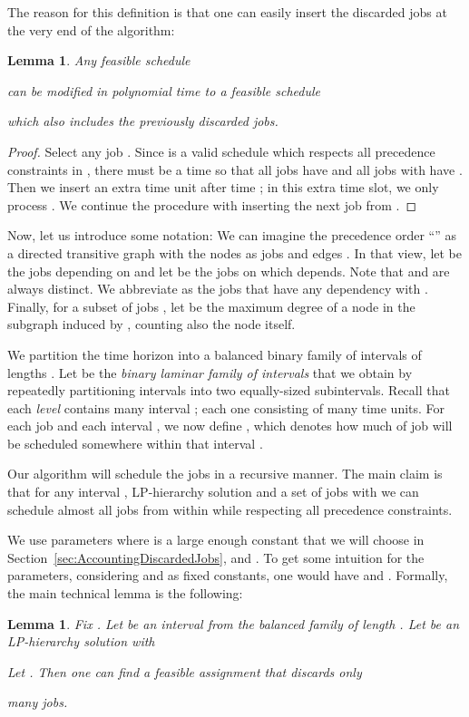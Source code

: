 \documentclass[11pt,letterpaper,oneside,english]{article}
\theoremstyle{theorem}
\newtheorem{lemma}[theorem]{Lemma}
\begin{document}
The reason for this definition is that one can easily insert the discarded jobs at the very end of the algorithm: 
\begin{lemma} \label{lem:InsertingDiscardedJobs}
Any feasible schedule 
 
can be modified in polynomial time 
to a feasible schedule 

which also includes the previously discarded jobs. 
\end{lemma}
\begin{proof} 
Select any job . Since  is a valid schedule which respects all precedence
constraints in , there must be a time  so that all jobs  have  and 
all jobs  with  have . Then we insert an extra time unit after time ; in
this extra time slot, we only process . We continue the procedure with inserting the next job from .
\end{proof}



Now, let us introduce some notation:
We can imagine the precedence order ``'' as a directed transitive graph  with the nodes
as jobs and edges . In that view, let  be the jobs 
depending on  and let   be the jobs on which  depends. 
Note that  and  are always distinct. We abbreviate  
as the jobs that have any dependency with . Finally, for a subset of jobs , 
let  be the 
maximum degree of a node in the subgraph induced by , counting also the node itself. 

We partition the time horizon  into a balanced binary family  of intervals of lengths . 
Let  be the \emph{binary laminar family of intervals} that
we obtain by repeatedly partitioning
intervals into two equally-sized subintervals.
Recall that each \emph{level}  contains 
many interval ; each one consisting
of  many time units. 
For each job  and each interval , we now define 
, which denotes how much 
of job  will be scheduled somewhere within 
that interval .


Our algorithm will schedule the jobs in  a recursive manner. The main claim is that for any interval ,  LP-hierarchy solution  and a set of jobs  with 
we can schedule almost all jobs from  within  while respecting all precedence constraints. 

We use parameters  where  is a large 
enough constant that we will choose 
in Section~\ref{sec:AccountingDiscardedJobs}, and .
To get some intuition for the parameters, considering  and  as fixed constants, 
one would have  and .
Formally, the main technical lemma is the following: \begin{lemma} \label{lem:MainRecursiveAlgorithm}
Fix . Let  be an interval from the balanced family of length .
Let  be an LP-hierarchy solution with 

Let
.
Then one can find a feasible assignment  
that discards only

many jobs.
\end{lemma}
\end{document}
